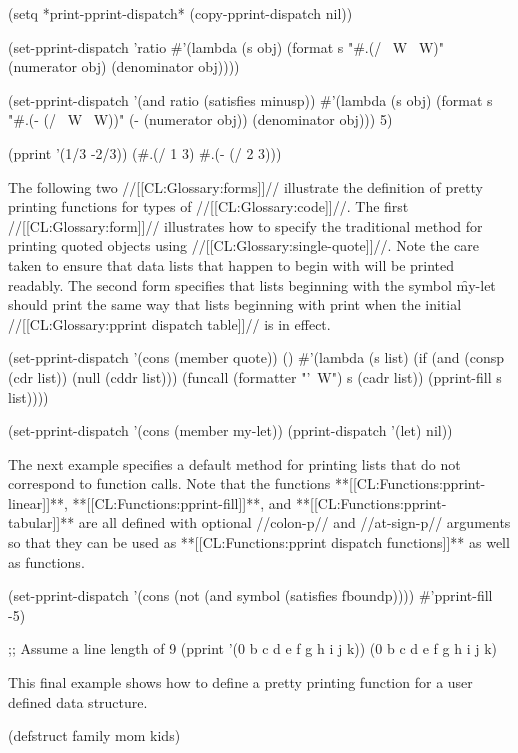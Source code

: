 \code
 (setq *print-pprint-dispatch* (copy-pprint-dispatch nil))

 (set-pprint-dispatch 'ratio
   #'(lambda (s obj)
       (format s "#.(/ ~W ~W)" 
                 (numerator obj) (denominator obj))))

 (set-pprint-dispatch '(and ratio (satisfies minusp))
   #'(lambda (s obj)
       (format s "#.(- (/ ~W ~W))" 
               (- (numerator obj)) (denominator obj)))
   5)

 (pprint '(1/3 -2/3))
 (#.(/ 1 3) \#.(- (/ 2 3)))
\endcode

The following two //[[CL:Glossary:forms]]// illustrate the definition of 
pretty printing functions for types of //[[CL:Glossary:code]]//.  The first
//[[CL:Glossary:form]]// illustrates how to specify the traditional method 
for printing quoted objects using //[[CL:Glossary:single-quote]]//.  Note
the care taken to ensure that data lists that happen to begin
with  will be printed readably.  The second form 
specifies that lists beginning with the symbol \f{my-let}
should print the same way that lists beginning with 
print when the initial //[[CL:Glossary:pprint dispatch table]]// is in effect.
 
\code
 (set-pprint-dispatch '(cons (member quote)) () 
   #'(lambda (s list)
       (if (and (consp (cdr list)) (null (cddr list)))
          (funcall (formatter "'~W") s (cadr list))
          (pprint-fill s list))))
 
 (set-pprint-dispatch '(cons (member my-let)) 
                      (pprint-dispatch '(let) nil))
\endcode
 
The next example specifies a default method for printing lists that do not
correspond to function calls.  Note that the functions **[[CL:Functions:pprint-linear]]**,
**[[CL:Functions:pprint-fill]]**, and **[[CL:Functions:pprint-tabular]]** are all defined with
optional //colon-p// and //at-sign-p// arguments so that they can 
be used as **[[CL:Functions:pprint dispatch functions]]** as well as  
functions.

\code
 (set-pprint-dispatch '(cons (not (and symbol (satisfies fboundp))))
                      #'pprint-fill -5)
 
 ;; Assume a line length of 9
 (pprint '(0 b c d e f g h i j k))
 (0 b c d
  e f g h
  i j k)
\endcode 

This final example shows how to define a pretty printing function for a
user defined data structure.
 
\code
 (defstruct family mom kids)
 

